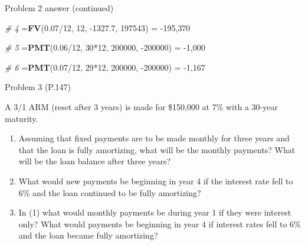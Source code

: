 \documentclass[ignorenonframetext,]{beamer}
\newenvironment{Shaded}{\begin{snugshade}}{\end{snugshade}}
\newcommand{\KeywordTok}[1]{\textcolor[rgb]{0.13,0.29,0.53}{\textbf{{#1}}}}
\newcommand{\DecValTok}[1]{\textcolor[rgb]{0.00,0.00,0.81}{{#1}}}
\newcommand{\FloatTok}[1]{\textcolor[rgb]{0.00,0.00,0.81}{{#1}}}
\newcommand{\StringTok}[1]{\textcolor[rgb]{0.31,0.60,0.02}{{#1}}}
\newcommand{\CommentTok}[1]{\textcolor[rgb]{0.56,0.35,0.01}{\textit{{#1}}}}
\newcommand{\NormalTok}[1]{{#1}}
\providecommand{\tightlist}{%
\setlength{\itemsep}{0pt}\setlength{\parskip}{0pt}}
\begin{document}
\begin{frame}[fragile]{Problem 2 answer (continued)}

\begin{Shaded}
\begin{Highlighting}[]
\CommentTok{# 4}
\NormalTok{=}\KeywordTok{FV}\NormalTok{(}\FloatTok{0.07}\NormalTok{/}\DecValTok{12}\NormalTok{, }\DecValTok{12}\NormalTok{, -}\FloatTok{1327.7}\NormalTok{, }\DecValTok{197543}\NormalTok{) =}\StringTok{ }\NormalTok{-}\DecValTok{195}\NormalTok{,}\DecValTok{370}

\CommentTok{# 5 }
\NormalTok{=}\KeywordTok{PMT}\NormalTok{(}\FloatTok{0.06}\NormalTok{/}\DecValTok{12}\NormalTok{, }\DecValTok{30}\NormalTok{*}\DecValTok{12}\NormalTok{, }\DecValTok{200000}\NormalTok{, -}\DecValTok{200000}\NormalTok{) =}\StringTok{ }\NormalTok{-}\DecValTok{1}\NormalTok{,}\DecValTok{000}

\CommentTok{# 6}
\NormalTok{=}\KeywordTok{PMT}\NormalTok{(}\FloatTok{0.07}\NormalTok{/}\DecValTok{12}\NormalTok{, }\DecValTok{29}\NormalTok{*}\DecValTok{12}\NormalTok{, }\DecValTok{200000}\NormalTok{, -}\DecValTok{200000}\NormalTok{) =}\StringTok{ }\NormalTok{-}\DecValTok{1}\NormalTok{,}\DecValTok{167}
\end{Highlighting}
\end{Shaded}

\normalsize

\end{frame}

\begin{frame}{Problem 3 (P.147)}

\small

A 3/1 ARM (reset after 3 years) is made for \$150,000 at 7\% with a
30-year maturity.

\begin{enumerate}
\def\labelenumi{\alph{enumi}.}
\tightlist
\item
  Assuming that fixed payments are to be made monthly for three years
  and that the loan is fully amortizing, what will be the monthly
  payments? What will be the loan balance after three years?
\item
  What would new payments be beginning in year 4 if the interest rate
  fell to 6\% and the loan continued to be fully amortizing?
\item
  In (1) what would monthly payments be during year 1 if they were
  interest only? What would payments be beginning in year 4 if interest
  rates fell to 6\% and the loan became fully amortizing?
\end{enumerate}

\end{frame}
\end{document}
